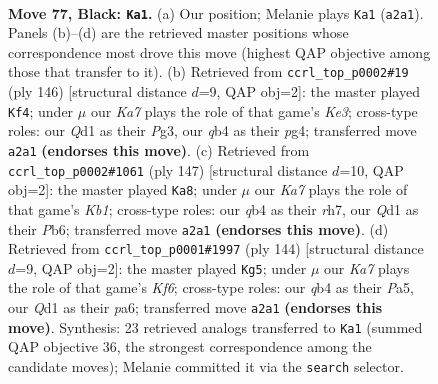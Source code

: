 \documentclass[11pt]{article}
\begin{document}
\clearpage

\begin{figure}[p]\centering
\begin{subfigure}{0.46\textwidth}\centering
\resizebox{\linewidth}{!}{%
\newchessgame
\chessboard[
  setfen={8/6K1/6N1/8/1Q6/8/k7/3q4 b - - 24 77},
  showmover=false,
  pgfstyle=straightmove, color=movearrow, markmove={a2-a1}
]}
\caption{}
\end{subfigure}\hfill
\begin{subfigure}{0.46\textwidth}\centering
\resizebox{\linewidth}{!}{%
\newchessgame
\chessboard[
  setfen={7n/7k/4N3/8/6p1/4K1P1/8/8 w - - 0 74},
  showmover=false,
  pgfstyle=straightmove, color=movearrow, markmove={e3-f4}
]}
\caption{}
\end{subfigure}
\\[4pt]
\begin{subfigure}{0.46\textwidth}\centering
\resizebox{\linewidth}{!}{%
\newchessgame
\chessboard[
  setfen={1k6/7R/1p1N4/4K3/8/8/2r5/8 b - - 12 74},
  showmover=false,
  pgfstyle=straightmove, color=movearrow, markmove={b8-a8}
]}
\caption{}
\end{subfigure}\hfill
\begin{subfigure}{0.46\textwidth}\centering
\resizebox{\linewidth}{!}{%
\newchessgame
\chessboard[
  setfen={8/8/p4K2/P7/2kn1B2/8/8/8 w - - 19 73},
  showmover=false,
  pgfstyle=straightmove, color=movearrow, markmove={f6-g5}
]}
\caption{}
\end{subfigure}
\caption{\textbf{Move 77, Black: \texttt{Ka1}.} (a) Our position; Melanie plays \texttt{Ka1} (\texttt{a2a1}). Panels (b)--(d) are the retrieved master positions whose correspondence most drove this move (highest QAP objective among those that transfer to it). (b) Retrieved from \texttt{ccrl\_top\_p0002\#19} (ply 146) [structural distance $d$=9, QAP obj=2]: the master played \texttt{Kf4}; under $\mu$ our \emph{Ka7} plays the role of that game's \emph{Ke3}; cross-type roles: our \emph{Q}d1 as their \emph{P}g3, our \emph{q}b4 as their \emph{p}g4; transferred move \texttt{a2a1} \textbf{(endorses this move)}. (c) Retrieved from \texttt{ccrl\_top\_p0002\#1061} (ply 147) [structural distance $d$=10, QAP obj=2]: the master played \texttt{Ka8}; under $\mu$ our \emph{Ka7} plays the role of that game's \emph{Kb1}; cross-type roles: our \emph{q}b4 as their \emph{r}h7, our \emph{Q}d1 as their \emph{P}b6; transferred move \texttt{a2a1} \textbf{(endorses this move)}. (d) Retrieved from \texttt{ccrl\_top\_p0001\#1997} (ply 144) [structural distance $d$=9, QAP obj=2]: the master played \texttt{Kg5}; under $\mu$ our \emph{Ka7} plays the role of that game's \emph{Kf6}; cross-type roles: our \emph{q}b4 as their \emph{P}a5, our \emph{Q}d1 as their \emph{p}a6; transferred move \texttt{a2a1} \textbf{(endorses this move)}. Synthesis: 23 retrieved analogs transferred to \texttt{Ka1} (summed QAP objective 36, the strongest correspondence among the candidate moves); Melanie committed it via the \texttt{search} selector.}
\label{fig:thought-m153}
\end{figure}
\end{document}

